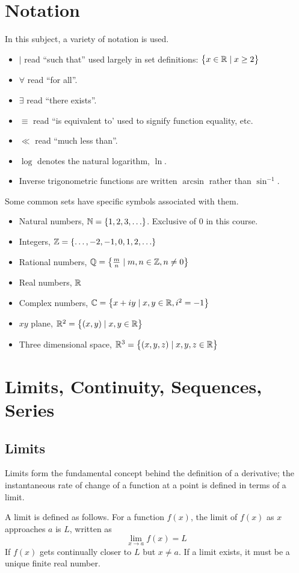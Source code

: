 \documentclass[12pt]{report}
\begin{document}
\begin{flushleft}

\section*{Notation}
In this subject, a variety of notation is used.
\begin{itemize}
    \item \(\mid\) read ``such that'' used largely in set definitions: 
        \(\set{x \in \mathbb{R}\mid x \geq 2}\)
    \item \(\forall\) read ``for all''.
    \item \(\exists\) read ``there exists''.
    \item \(\equiv\) read ``is equivalent to' used to signify function
        equality, etc.
    \item \(\ll\) read ``much less than''.
    \item \(\log\) denotes the natural logarithm, \(\ln\).
    \item Inverse trigonometric functions are written \(\arcsin\) rather than
        \(\sin^{-1}\).
\end{itemize}

Some common sets have specific symbols associated with them.
\begin{itemize}
    \item Natural numbers, \(\mathbb{N} = \set{1, 2, 3, \ldots}\). Exclusive of \(0\)
        in this course.
    \item Integers, \(\mathbb{Z} = \set{\ldots, -2, -1, 0, 1, 2, \ldots}\)
    \item Rational numbers, 
        \(\mathbb{Q} = \set{\frac{m}{n} \mid m, n \in \mathbb{Z}, n \neq 0}\)
    \item Real numbers, \(\mathbb{R}\)
    \item Complex numbers, \(\mathbb{C} = \set{x + iy \mid x, y \in \mathbb{R}, i^2 = -1}\)
    \item \(xy\) plane, \(\mathbb{R}^2 = \set{(x, y) \mid x, y \in \mathbb{R}}\)
    \item Three dimensional space, 
        \(\mathbb{R}^3 = \set{(x, y, z) \mid x, y, z \in \mathbb{R}}\)
\end{itemize}

\section*{Limits, Continuity, Sequences, Series}
\subsection*{Limits}
Limits form the fundamental concept behind the definition of a derivative;
the instantaneous rate of change of a function at a point is defined in terms
of a limit. \par
A limit is defined as follows. For a function \(f(x)\), the limit of \(f(x)\) 
as \(x\) approaches \(a\) is \(L\), written as
\[\lim_{x\rightarrow a}f(x) = L\]
If \(f(x)\) gets continually closer to \(L\) but \(x \neq a\). If a limit 
exists, it must be a unique finite real number.


\end{flushleft}
\end{document}
